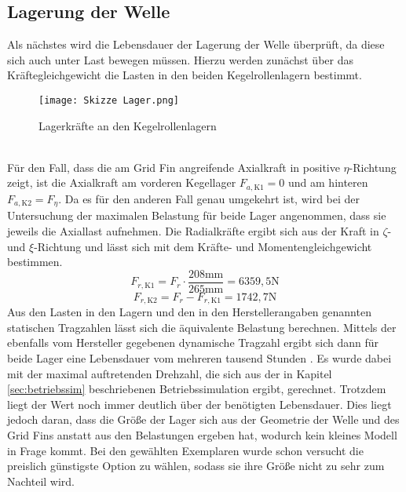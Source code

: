 \subsection{Lagerung der Welle}\label{sec:lagerWelle}
Als nächstes wird die Lebensdauer der Lagerung der Welle überprüft, da diese sich auch unter Last bewegen müssen. Hierzu werden zunächst über das Kräftegleichgewicht die Lasten in den beiden Kegelrollenlagern bestimmt.
\begin{figure}[h] 
	\centering
	\texttt{[image: Skizze Lager.png]}
	\caption{Lagerkräfte an den Kegelrollenlagern}
\end{figure}\\
Für den Fall, dass die am Grid Fin angreifende Axialkraft in positive $\eta$-Richtung zeigt, ist die Axialkraft am vorderen Kegellager $F_{a, \mathrm{K1}} = 0$ und am hinteren $F_{a, \mathrm{K2}} = F_\eta$. Da es für den anderen Fall genau umgekehrt ist, wird bei der Untersuchung der maximalen Belastung für beide Lager angenommen, dass sie jeweils die Axiallast aufnehmen. Die Radialkräfte ergibt sich aus der Kraft in $\zeta$- und $\xi$-Richtung und lässt sich mit dem Kräfte- und Momentengleichgewicht bestimmen.
\begin{equation}\label{eq_lagerWelle1}
	F_{r, \mathrm{K1}} = F_r\cdot\frac{208\mathrm{mm}}{265\mathrm{mm}}=6359,5\mathrm{N}
\end{equation}
\begin{equation}\label{eq_lagerWelle2}
	F_{r, \mathrm{K2}} = F_r-F_{r, \mathrm{K1}}=1742,7\mathrm{N}
\end{equation}
Aus den Lasten in den Lagern und den in den Herstellerangaben genannten statischen Tragzahlen lässt sich die äquivalente Belastung berechnen. Mittels der ebenfalls vom Hersteller gegebenen dynamische Tragzahl ergibt sich dann für beide Lager eine Lebensdauer vom mehreren tausend Stunden \cite{metall}. Es wurde dabei mit der maximal auftretenden Drehzahl, die sich aus der in Kapitel \ref{sec:betriebssim} beschriebenen Betriebssimulation ergibt, gerechnet. Trotzdem liegt der Wert noch immer deutlich über der benötigten Lebensdauer. Dies liegt jedoch daran, dass die Größe der Lager sich aus der Geometrie der Welle und des Grid Fins anstatt aus den Belastungen ergeben hat, wodurch kein kleines Modell in Frage kommt. Bei den gewählten Exemplaren wurde schon versucht die preislich günstigste Option zu wählen, sodass sie ihre Größe nicht zu sehr zum Nachteil wird.
